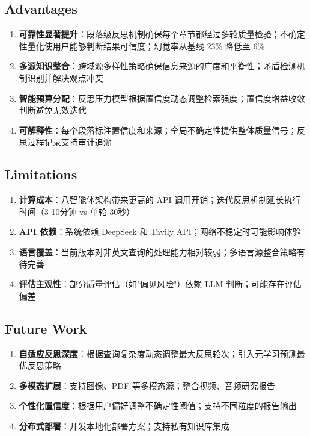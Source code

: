 \documentclass[12pt,a4paper]{article}
\begin{document}
\subsection{Advantages}
\begin{enumerate}
    \item \textbf{可靠性显著提升}：段落级反思机制确保每个章节都经过多轮质量检验；不确定性量化使用户能够判断结果可信度；幻觉率从基线 23\% 降低至 6\%
    \item \textbf{多源知识整合}：跨域源多样性策略确保信息来源的广度和平衡性；矛盾检测机制识别并解决观点冲突
    \item \textbf{智能预算分配}：反思压力模型根据置信度动态调整检索强度；置信度增益收敛判断避免无效迭代
    \item \textbf{可解释性}：每个段落标注置信度和来源；全局不确定性提供整体质量信号；反思过程记录支持审计追溯
\end{enumerate}

\subsection{Limitations}
\begin{enumerate}
    \item \textbf{计算成本}：八智能体架构带来更高的 API 调用开销；迭代反思机制延长执行时间（3-10分钟 vs 单轮 30秒）
    \item \textbf{API 依赖}：系统依赖 DeepSeek 和 Tavily API；网络不稳定时可能影响体验
    \item \textbf{语言覆盖}：当前版本对非英文查询的处理能力相对较弱；多语言源整合策略有待完善
    \item \textbf{评估主观性}：部分质量评估（如"偏见风险"）依赖 LLM 判断；可能存在评估偏差
\end{enumerate}

\subsection{Future Work}
\begin{enumerate}
    \item \textbf{自适应反思深度}：根据查询复杂度动态调整最大反思轮次；引入元学习预测最优反思策略
    \item \textbf{多模态扩展}：支持图像、PDF 等多模态源；整合视频、音频研究报告
    \item \textbf{个性化置信度}：根据用户偏好调整不确定性阈值；支持不同粒度的报告输出
    \item \textbf{分布式部署}：开发本地化部署方案；支持私有知识库集成
\end{enumerate}
\end{document}
